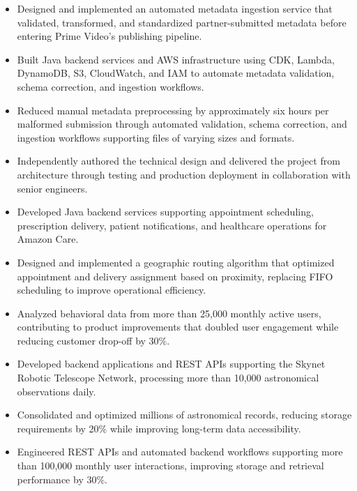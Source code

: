 \documentclass[10pt,letterpaper]{article}
\begin{document}
\vspace{3pt}


\begin{itemize}
\item Designed and implemented an automated metadata ingestion service that validated, transformed, and standardized partner-submitted metadata before entering Prime Video's publishing pipeline.
\item Built Java backend services and AWS infrastructure using CDK, Lambda, DynamoDB, S3, CloudWatch, and IAM to automate metadata validation, schema correction, and ingestion workflows.
\item Reduced manual metadata preprocessing by approximately six hours per malformed submission through automated validation, schema correction, and ingestion workflows supporting files of varying sizes and formats.
\item Independently authored the technical design and delivered the project from architecture through testing and production deployment in collaboration with senior engineers.
\end{itemize}

\vspace{3pt}


\begin{itemize}
\item Developed Java backend services supporting appointment scheduling, prescription delivery, patient notifications, and healthcare operations for Amazon Care.
\item Designed and implemented a geographic routing algorithm that optimized appointment and delivery assignment based on proximity, replacing FIFO scheduling to improve operational efficiency.
\item Analyzed behavioral data from more than 25,000 monthly active users, contributing to product improvements that doubled user engagement while reducing customer drop-off by 30\%.
\end{itemize}

\vspace{3pt}


\begin{itemize}
\item Developed backend applications and REST APIs supporting the Skynet Robotic Telescope Network, processing more than 10,000 astronomical observations daily.
\item Consolidated and optimized millions of astronomical records, reducing storage requirements by 20\% while improving long-term data accessibility.
\item Engineered REST APIs and automated backend workflows supporting more than 100,000 monthly user interactions, improving storage and retrieval performance by 30\%.
\end{itemize}
\end{document}
